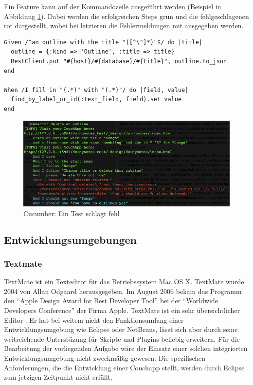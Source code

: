 Ein Feature kann auf der Kommandozeile ausgeführt werden (Beispiel in Abbildung \ref{fig:cucumber-bad}). Dabei werden die erfolgreichen Steps grün und die fehlgeschlagenen rot dargestellt, wobei bei letzteren die Fehlermeldungen mit ausgegeben werden.  

\medskip
\begin{lstlisting}[caption=Cucumber Step-Definition,label=lst:cucumber-steps]
Given /^an outline with the title "([^\"]*)"$/ do |title|
  outline = {:kind => 'Outline', :title => title}
  RestClient.put "#{host}/#{database}/#{title}", outline.to_json
end

When /I fill in "(.*)" with "(.*)"/ do |field, value|
  find_by_label_or_id(:text_field, field).set value
end
\end{lstlisting}

\medskip
\begin{figure}[ht] 
  \begin{center}
    \includegraphics[width=\textwidth]{grafik/cucumber-example-bad} 
  \end{center}
  \caption{Cucumber: Ein Test schlägt fehl}
  \label{fig:cucumber-bad} 
\end{figure}




\subsection{Entwicklungsumgebungen}

\subsubsection{Textmate}

TextMate \cite{textmate:website} ist ein Texteditor für das Betriebssystem Mac OS X. TextMate wurde 2004 von Allan Odgaard herausgegeben. Im August 2006 bekam das Programm den \enquote{Apple Design Award for Best Developer Tool} bei der \enquote{Worldwide Developers Conference} der Firma Apple. TextMate ist ein sehr übersichtlicher Editor . Er hat bei weitem nicht den Funktionsumfang einer Entwicklungsumgebung wie Eclipse oder NetBeans, lässt sich aber durch seine weitreichende Unterstüzung für Skripte und Plugins beliebig erweitern. Für die Bearbeitung der vorliegenden Aufgabe wäre der Einsatz einer solchen integrierten Entwicklungsumgebung nicht zweckmäßig gewesen: Die spezifischen Anforderungen, die die Entwicklung einer Couchapp stellt, werden durch Eclipse zum jetzigen Zeitpunkt nicht erfüllt. 

